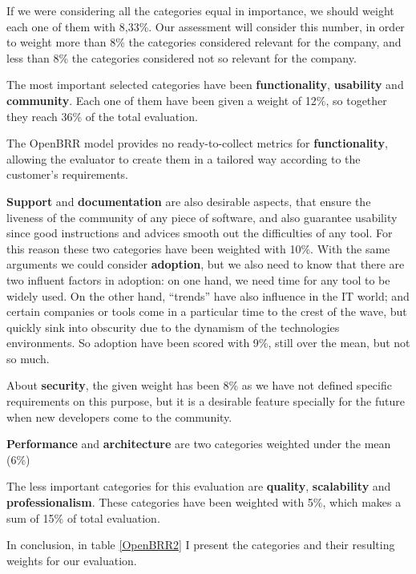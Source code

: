 \documentclass[a4paper,12pt]{book}
\begin{document}
If we were considering all the categories equal in importance, we should weight
each one of them with 8,33\%. Our assessment will consider this number, in
order to weight more than 8\% the categories considered relevant for the
company, and less than 8\% the categories considered not so relevant for the
company.

The most important selected categories have been \textbf{functionality},
\textbf{usability} and \textbf{community}. Each one of them have been given a
weight of 12\%, so together they reach 36\% of the total evaluation.

The OpenBRR model provides no ready-to-collect metrics for
\textbf{functionality}, allowing the evaluator to create them in a tailored way
according to the customer's requirements. 


\textbf{Support} and \textbf{documentation} are also desirable aspects, that
ensure the liveness of the community of any piece of software, and also
guarantee usability since good instructions and advices smooth out the
difficulties of any tool. For this reason these two categories have been
weighted with 10\%. With the same arguments we could consider
\textbf{adoption}, but we also need to know that there are two influent factors
in adoption: on one hand, we need time for any tool to be widely used. On the
other hand, ``trends'' have also influence in the IT world; and certain
companies or tools come in a particular time to the crest of the wave, but
quickly sink into obscurity due to the dynamism of the technologies
environments. So adoption have been scored with 9\%, still over the mean, but
not so much.

About \textbf{security}, the given weight has been 8\% as we have not defined specific requirements on this purpose, but it is a desirable feature specially for the future when new developers come to the community.

\textbf{Performance} and \textbf{architecture} are two categories weighted under the mean (6\%)

The less important categories for this evaluation are \textbf{quality},
\textbf{scalability} and \textbf{professionalism}. These categories have been
weighted with 5\%, which makes a sum of 15\% of total evaluation. 

In conclusion, in table \ref{OpenBRR2} I present the categories and
their resulting weights for our evaluation.
\end{document}
